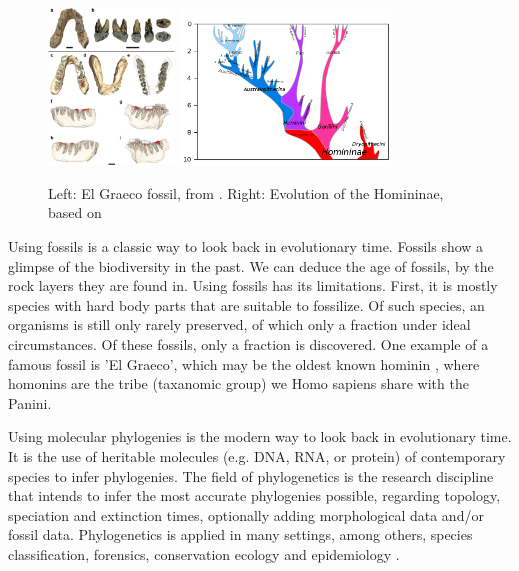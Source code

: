 \begin{figure}[H]
  \includegraphics[width=0.3\textwidth]{Graecopithecus.jpg}
  \includegraphics[width=0.5\textwidth]{Hominini_lineage.png}
  \caption{
    Left: El Graeco fossil, from \cite{fuss2017potential}.
    Right: Evolution of the Homininae, based on \cite{stringer2012makes}
 }
  \label{fig:human_evolution}
\end{figure}

Using fossils is a classic way to look back in evolutionary time.
Fossils show a glimpse of the biodiversity in the past.
We can deduce the age of fossils, by the rock layers they are found in.
Using fossils has its limitations. First, it is mostly species with hard body
parts that are suitable to fossilize. Of such species, an organisms is still 
only rarely preserved, of which only a fraction under ideal circumstances. Of 
these fossils, only a fraction is discovered.
One example of a famous fossil is 'El Graeco', 
which may be the oldest known hominin \cite{fuss2017potential}, where
homonins are the tribe (taxanomic group) we Homo sapiens share with the Panini.

Using molecular phylogenies is the modern way to look back in evolutionary time.
It is the use of heritable molecules (e.g. DNA, RNA, or protein)  
of contemporary species to infer phylogenies. 
The field of phylogenetics is the research discipline that
intends to infer the most accurate phylogenies possible, 
regarding topology, speciation and extinction times,
optionally adding morphological data and/or fossil data.
Phylogenetics is applied in many settings, among
others, species classification,
forensics, conservation ecology
and epidemiology \cite{lam2010use}.

